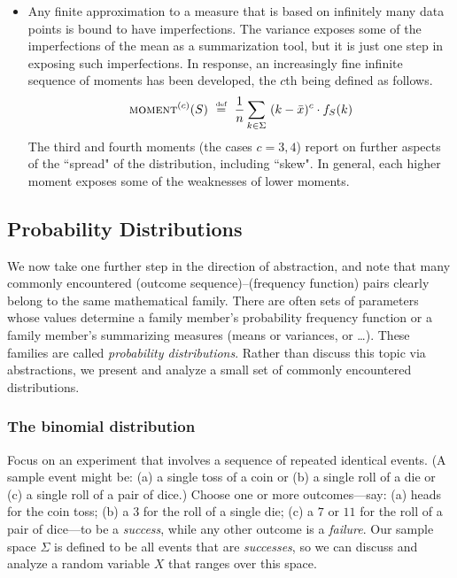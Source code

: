 \begin{itemize}
\item
Any finite approximation to a measure that is based on infinitely many data points is bound to have imperfections.  The variance exposes some of the imperfections of the mean as a summarization tool, but it is just one step in exposing such imperfections.  In response, an increasingly fine infinite sequence of moments has been developed, the $c$th being defined as follows.
\[
\mbox{\sc moment}^{(c)}(S) \ \stackrel{\mbox{{\tiny def}}}{=} \ {1 \over n} \sum_{k \in \Sigma} \ (k - \bar{x})^c \cdot f_S(k)
\]
The third and fourth moments (the cases $c = 3,4$) report on further aspects of the ``spread" of the distribution, including ``skew".  In general, each higher moment exposes some of the weaknesses of lower moments.
\end{itemize}


\subsection{Probability Distributions}
\label{sec:prob-distr}

We now take one further step in the direction of abstraction, and note that many commonly encountered (outcome sequence)--(frequency function) pairs clearly belong to the same mathematical family.  There are often sets of parameters whose values determine a family member's probability frequency function
or a family member's summarizing measures (means or variances, or \ldots).  These families are called {\em probability distributions}.  Rather than discuss this topic via abstractions, we present and analyze a small set of commonly encountered distributions.

\subsubsection{The binomial distribution}
\label{sec:binomial-distribution}

Focus on an experiment that involves a sequence of repeated identical events.  (A sample event might be: (a) a single toss of a coin or (b) a single roll of a die or (c) a single roll of a pair of dice.)  Choose one or more outcomes---say: (a) {\sc heads} for the coin toss; (b) a $3$ for the roll of a single die; (c) a $7$ or $11$ for the roll of a pair of dice---to be a {\em success}, while any other outcome is a {\em failure}.  Our sample space $\Sigma$ is defined to be all events that are {\em successes}, so we can discuss and analyze a random variable $X$ that ranges over this space.

